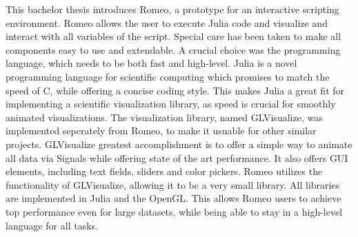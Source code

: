 This bachelor thesis introduces Romeo, a prototype for an interactive scripting environment.
Romeo allows the user to execute Julia code and visualize and interact with all variables of the script.
Special care has been taken to make all components easy to use and extendable.
A crucial choice was the programming language, which needs to be both fast and high-level.
Julia is a novel programming language for scientific computing which promises to match the speed of C, while offering a concise coding style. 
This makes Julia a great fit for implementing a scientific visualization library, as speed is crucial for smoothly animated visualizations.
The visualization library, named GLVisualize, was implemented seperately from Romeo, to make it usuable for other similar projects. 
GLVisualize greatest accomplishment is to offer a simple way to animate all data via Signals while offering state of the art performance.
It also offers \ac{GUI} elements, including text fields, sliders and color pickers. 
Romeo utilizes the functionality of GLVisualize, allowing it to be a very small library.
All libraries are implemented in Julia and the \ac{OpenGL}.
This allows Romeo users to achieve top performance even for large datasets, while being able to stay in a high-level language for all tasks.
